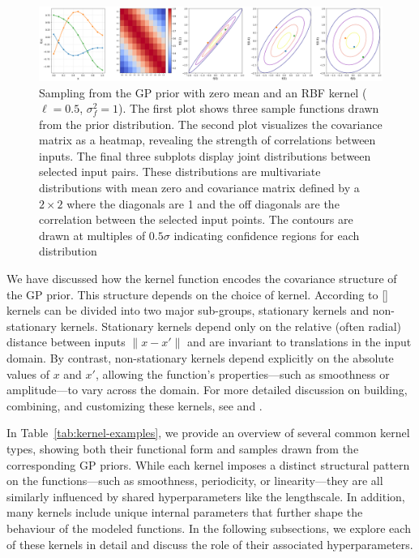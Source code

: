 \documentclass{ucdgradtaughtthesis}
\begin{document}
\begin{figure}[H]
    \centering
       \includegraphics[width=\textwidth]{LatexPlots/1dplots/Kernel_background.png}
        \caption[Visualising the assumptions the kernel encodes into our GP process.]{Sampling from the GP prior with zero mean and an RBF kernel ($\ell = 0.5$, $\sigma_f^2 = 1$). 
        The first plot shows three sample functions drawn from the prior distribution. 
        The second plot visualizes the covariance matrix as a heatmap, revealing the strength of correlations between inputs.
        The final three subplots display joint distributions between selected input pairs. These distributions are multivariate distributions with mean zero and covariance matrix defined by a \(2 \times 2\) where the diagonals are 1 and the off diagonals are the correlation between the selected input points.
        The contours are drawn at multiples of \(0.5 \sigma\) indicating confidence regions for each distribution}
    \label{fig: samples_from_GP_prior}
\end{figure}
%

We have discussed how the kernel function encodes the covariance structure of the GP prior. This structure depends on the choice of kernel. According to [\cite{bible}]
kernels can be divided into two major sub-groups, stationary kernels and non-stationary kernels. 
Stationary kernels depend only on the relative (often radial) distance between inputs \(\|x - x'\|\) and are invariant to translations 
in the input domain. By contrast, non-stationary kernels depend explicitly on 
the absolute values of \(x\) and \(x'\), allowing the function’s properties—such as smoothness 
or amplitude—to vary across the domain. For more detailed discussion on building, combining, and customizing these kernels, 
see \cite{kernelcookbook} and \cite[Ch.~4]{bible}.
%

In Table~\ref{tab:kernel-examples}, we provide an overview of several common kernel types, 
showing both their functional form and samples drawn from the corresponding GP priors. 
While each kernel imposes a distinct structural pattern on the functions—such as smoothness, periodicity, or linearity—they are all similarly influenced by shared hyperparameters like the lengthscale. 
In addition, many kernels include unique internal parameters that further shape the behaviour of the modeled functions. 
In the following subsections, we explore each of these kernels in detail and discuss the role of their associated hyperparameters.
%
\end{document}
